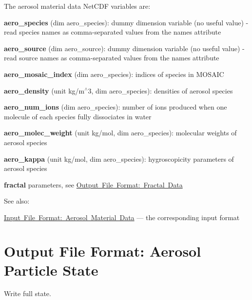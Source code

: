 The aerosol material data Net\+C\+DF variables are\+:
\begin{DoxyItemize}
\item {\bfseries aero\+\_\+species} (dim {\ttfamily aero\+\_\+species})\+: dummy dimension variable (no useful value) -\/ read species names as comma-\/separated values from the \textquotesingle{}names\textquotesingle{} attribute
\item {\bfseries aero\+\_\+source} (dim {\ttfamily aero\+\_\+source})\+: dummy dimension variable (no useful value) -\/ read source names as comma-\/separated values from the \textquotesingle{}names\textquotesingle{} attribute
\item {\bfseries aero\+\_\+mosaic\+\_\+index} (dim {\ttfamily aero\+\_\+species})\+: indices of species in M\+O\+S\+A\+IC
\item {\bfseries aero\+\_\+density} (unit kg/m$^\wedge$3, dim {\ttfamily aero\+\_\+species})\+: densities of aerosol species
\item {\bfseries aero\+\_\+num\+\_\+ions} (dim {\ttfamily aero\+\_\+species})\+: number of ions produced when one molecule of each species fully dissociates in water
\item {\bfseries aero\+\_\+molec\+\_\+weight} (unit kg/mol, dim {\ttfamily aero\+\_\+species})\+: molecular weights of aerosol species
\item {\bfseries aero\+\_\+kappa} (unit kg/mol, dim {\ttfamily aero\+\_\+species})\+: hygroscopicity parameters of aerosol species
\item {\bfseries fractal} parameters, see \mbox{\hyperlink{output_format_fractal}{Output File Format\+: Fractal Data}}
\end{DoxyItemize}

See also\+:
\begin{DoxyItemize}
\item \mbox{\hyperlink{input_format_aero_data}{Input File Format\+: Aerosol Material Data}} --- the corresponding input format 
\end{DoxyItemize}\hypertarget{output_format_aero_state}{}\section{Output File Format\+: Aerosol Particle State}\label{output_format_aero_state}
Write full state.


